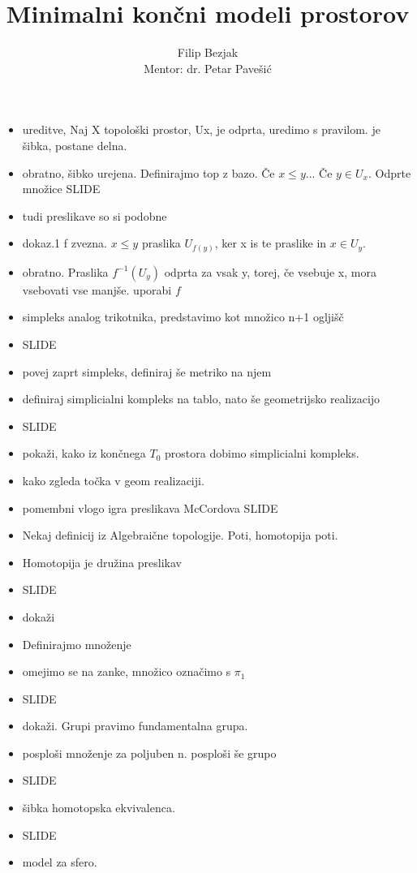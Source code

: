 \documentclass[a4paper,12pt]{article}
\title{Minimalni končni modeli prostorov}
\author{Filip Bezjak \\ Mentor: dr. Petar Pavešić}
\begin{document}
\begin{itemize}
    \item ureditve, Naj X topološki prostor, Ux, je odprta, uredimo s pravilom. je šibka, postane delna.
    \item obratno, šibko urejena. Definirajmo top z bazo. Če $x \le y$... Če $y\in U_x$. Odprte množice SLIDE
    \item tudi preslikave so si podobne
    \item dokaz.1 f zvezna. $x\le y$ praslika $U_{f(y)}$, ker x is te praslike in $x \in U_y$.
    \item obratno. Praslika $f^{-1}(U_y)$ odprta za vsak y, torej, če vsebuje x, mora vsebovati vse manjše. uporabi $f$
    \item simpleks analog trikotnika, predstavimo kot množico n+1 ogljišč
    \item SLIDE
    \item povej zaprt simpleks, definiraj še metriko na njem
    \item definiraj simplicialni kompleks na tablo, nato še geometrijsko realizacijo
    \item SLIDE
    \item pokaži, kako iz končnega $T_0$ prostora dobimo simplicialni kompleks.
    \item kako zgleda točka v geom realizaciji.
    \item pomembni vlogo igra preslikava McCordova SLIDE
    \item Nekaj definicij iz Algebraične topologije. Poti, homotopija poti.
    \item Homotopija je družina preslikav
    \item SLIDE
    \item dokaži
    \item Definirajmo množenje
    \item omejimo se na zanke, množico označimo s $\pi_1$
    \item SLIDE
    \item dokaži. Grupi pravimo fundamentalna grupa.
    \item posploši množenje za poljuben n. posploši še grupo
    \item SLIDE
    \item šibka homotopska ekvivalenca.
    \item SLIDE
    \item model za sfero.
\end{itemize}
\end{document}

